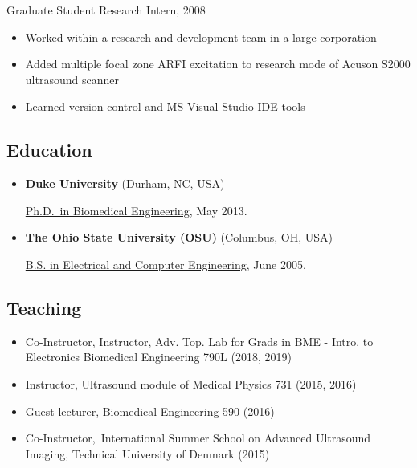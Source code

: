 \documentclass[
]{article}
\providecommand{\tightlist}{%
  \setlength{\itemsep}{0pt}\setlength{\parskip}{0pt}}
\begin{document}
\begin{itemize}
  Graduate Student Research Intern, 2008

  \begin{itemize}
  \tightlist
  \item
    Worked within a research and development team in a large corporation
  \item
    Added multiple focal zone ARFI excitation to research mode of Acuson
    S2000 ultrasound scanner
  \item
    Learned
    \href{http://www-03.ibm.com/software/products/en/clearcase}{version
    control} and \href{http://www.visualstudio.com/}{MS Visual Studio
    IDE} tools
  \end{itemize}
\end{itemize}

\hypertarget{education}{%
\subsection{Education}\label{education}}

\begin{itemize}
\item
  \textbf{Duke University} (Durham, NC, USA)

  \href{http://bme.duke.edu/grad}{Ph.D.~in Biomedical Engineering}, May
  2013.
\item
  \textbf{The Ohio State University (OSU)} (Columbus, OH, USA)

  \href{http://ece.osu.edu/futurestudents/undergrad}{B.S. in Electrical
  and Computer Engineering}, June 2005.
\end{itemize}

\hypertarget{teaching}{%
\subsection{Teaching}\label{teaching}}

\begin{itemize}
\tightlist
\item
  Co-Instructor, Instructor, Adv. Top. Lab for Grads in BME - Intro. to
  Electronics Biomedical Engineering 790L (2018, 2019)
\item
  Instructor, Ultrasound module of Medical Physics 731 (2015, 2016)
\item
  Guest lecturer, Biomedical Engineering 590 (2016)
\item
  Co-Instructor,~International Summer School on Advanced Ultrasound
  Imaging, Technical University of Denmark (2015)
\end{itemize}
\end{document}

